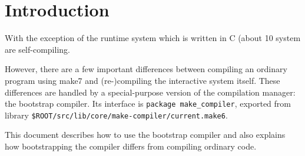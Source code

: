 
\section{Introduction}

With the exception of the runtime system which is written in C
(about 10%
system are self-compiling.

However, there are a few important differences between compiling an
ordinary program using make7 and (re-)compiling the interactive system
itself.  These differences are handled by a special-purpose version of
the compilation manager: the bootstrap compiler.  Its interface is
{\tt package make_compiler}, exported from library {\tt \$ROOT/src/lib/core/make-compiler/current.make6}.

This document describes how to use the bootstrap compiler and also
explains how bootstrapping the compiler differs from compiling
ordinary code.
